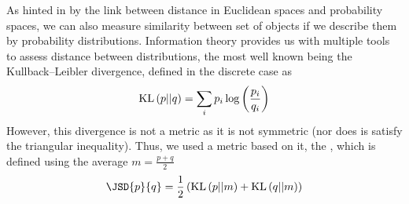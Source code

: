 As hinted in \emd{} by the link between distance in Euclidean spaces and
probability spaces, we can also measure similarity between set of objects if we
describe them by probability distributions. Information theory provides us with
multiple tools to assess distance between distributions, the most well known
being the Kullback--Leibler divergence, defined in the discrete case as
\begin{equation*}
	\mathrm{KL}\left(p||q\right) = \sum_i p_i\log\left(\frac{p_i}{q_i}\right) 
\end{equation*}
However, this divergence is not a metric as it is not symmetric (nor does is
satisfy the triangular inequality). Thus, we used a metric based on it, the
 \autocite{JensenShannon03}, which is
defined using the average $m=\frac{p+q}{2}$
\begin{equation*}
	\JSD{p}{q} = \frac{1}{2}\left(\KL{p}{m} + \KL{q}{m}\right) 
\end{equation*}
